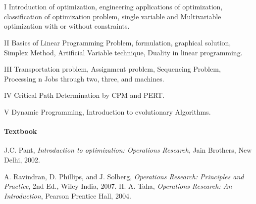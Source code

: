 \section{\courseinfo}

\unit{I}
Introduction of optimization, engineering applications of optimization, classification of optimization problem, single variable and Multivariable optimization with or without constraints. 

\unit{II} 
Basics of Linear Programming Problem, formulation, graphical solution, Simplex Method, Artificial Variable technique, Duality in linear programming.

\unit{III}
Transportation problem, Assignment problem, Sequencing Problem, Processing n Jobs through two, three, and machines.

\unit{IV}
Critical Path Determination by CPM and PERT.

\unit{V}
 Dynamic Programming, Introduction to evolutionary Algorithms.


\paragraph{Textbook}
J.C. Pant, \emph{Introduction to optimization: Operations Research}, Jain Brothers, New Delhi, 2002.


\begin{thebibliography}{}
	\let\clearpage\relax
	A. Ravindran, D. Phillips, and J. Solberg, \emph{Operations Research: Principles and Practice}, 2nd Ed., Wiley India, 2007.
	 H. A. Taha, \emph{Operations Research: An Introduction}, Pearson Prentice Hall, 2004.
\end{thebibliography}
